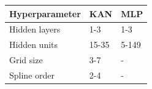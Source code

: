 \begin{tabular}{lll}
\toprule
Hyperparameter & KAN & MLP \\
\midrule
Hidden layers & 1-3 & 1-3 \\
Hidden units & 15-35 & 5-149 \\
Grid size & 3-7 & - \\
Spline order & 2-4 & - \\
\bottomrule
\end{tabular}
